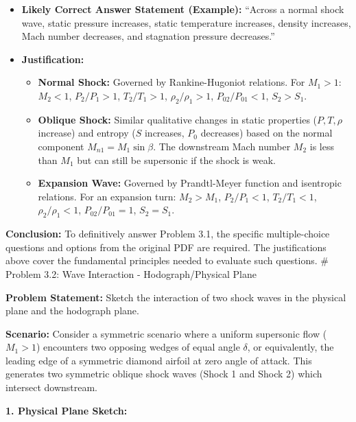 \begin{itemize}
\tightlist
\item
  \textbf{Likely Correct Answer Statement (Example):} ``Across a normal
  shock wave, static pressure increases, static temperature increases,
  density increases, Mach number decreases, and stagnation pressure
  decreases.''
\item
  \textbf{Justification:}

  \begin{itemize}
  \tightlist
  \item
    \textbf{Normal Shock:} Governed by Rankine-Hugoniot relations. For
    \(M_1 > 1\): \(M_2 < 1\), \(P_2/P_1 > 1\), \(T_2/T_1 > 1\),
    \(\rho_2/\rho_1 > 1\), \(P_{02}/P_{01} < 1\), \(S_2 > S_1\).
  \item
    \textbf{Oblique Shock:} Similar qualitative changes in static
    properties (\(P, T, \rho\) increase) and entropy (\(S\) increases,
    \(P_0\) decreases) based on the normal component
    \(M_{n1} = M_1 \sin\beta\). The downstream Mach number \(M_2\) is
    less than \(M_1\) but can still be supersonic if the shock is weak.
  \item
    \textbf{Expansion Wave:} Governed by Prandtl-Meyer function and
    isentropic relations. For an expansion turn: \(M_2 > M_1\),
    \(P_2/P_1 < 1\), \(T_2/T_1 < 1\), \(\rho_2/\rho_1 < 1\),
    \(P_{02}/P_{01} = 1\), \(S_2 = S_1\).
  \end{itemize}
\end{itemize}

\textbf{Conclusion:} To definitively answer Problem 3.1, the specific
multiple-choice questions and options from the original PDF are
required. The justifications above cover the fundamental principles
needed to evaluate such questions. \# Problem 3.2: Wave Interaction -
Hodograph/Physical Plane

\textbf{Problem Statement:} Sketch the interaction of two shock waves in
the physical plane and the hodograph plane.

\textbf{Scenario:} Consider a symmetric scenario where a uniform
supersonic flow (\(M_1 > 1\)) encounters two opposing wedges of equal
angle \(\delta\), or equivalently, the leading edge of a symmetric
diamond airfoil at zero angle of attack. This generates two symmetric
oblique shock waves (Shock 1 and Shock 2) which intersect downstream.

\textbf{1. Physical Plane Sketch:}

